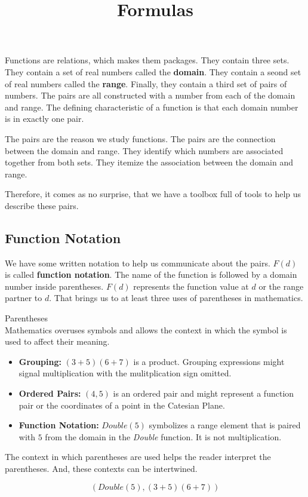 \documentclass{ximera}
\title{Formulas}
\begin{document}
\begin{abstract}

\end{abstract}
\maketitle


Functions are relations, which makes them packages.  They contain three sets.  They contain a set of real numbers called the \textbf{domain}.  They contain a seond set of real numbers called the \textbf{range}. Finally, they contain a third set of pairs of numbers.  The pairs are all constructed with a number from each of the domain and range. The defining characteristic of a function is that each domain number is in exactly one pair.

The pairs are the reason we study functions.  The pairs are the connection between the domain and range.  They identify which numbers are associated together from both sets. They itemize the association between the domain and range.

Therefore, it comes as no surprise, that we have a toolbox full of tools to help us describe these pairs.


\subsection{Function Notation}

We have some written notation to help us communicate about the pairs.  $F(d)$ is called \textbf{function notation}. The name of the function is followed by a domain number inside parentheses. $F(d)$ represents the function value at $d$ or the range partner to $d$.  That brings us to at least three uses of parentheses in mathematics.

\begin{notation}  Parentheses \\

Mathematics overuses symbols and allows the context in which the symbol is used to affect their meaning.
	\begin{itemize}
		\item \textbf{Grouping:} $(3+5)(6+7)$ is a product.  Grouping expressions might signal multiplication with the mulitplication sign omitted.
		\item \textbf{Ordered Pairs:} $(4, 5)$ is an ordered pair and might represent a function pair or the coordinates of a point in the Catesian Plane.
		\item \textbf{Function Notation:} $Double(5)$ symbolizes a range element that is paired with $5$ from the domain in the \textit{Double} function. It is not multiplication.
	\end{itemize}


The context in which parentheses are used helps the reader interpret the parentheses.  And, these contexts can be intertwined.

\[  (Double(5), (3+5)(6+7))    \]
\end{notation}
\end{document}
